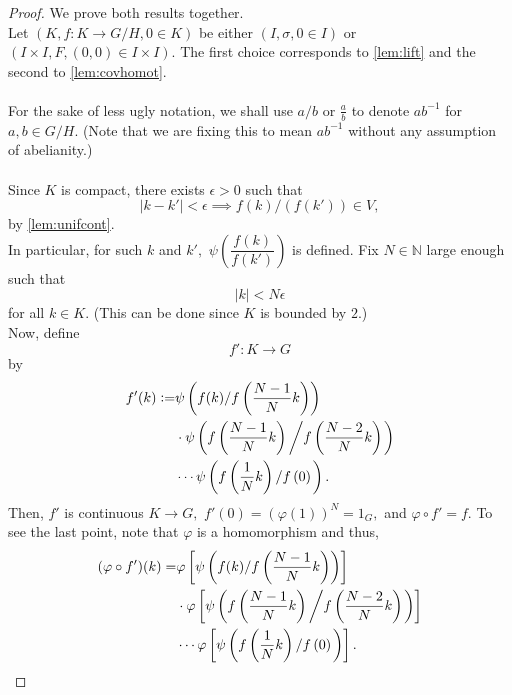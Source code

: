 \documentclass[12pt]{article}
\theoremstyle{definition}
\numberwithin{thm}{section}
\begin{document}
\begin{proof} 
 	We prove both results together.\\
 	Let $(K, f:K\to G/H, 0 \in K)$ be either $(I, \sigma, 0 \in I)$ or $(I \times I, F, (0, 0) \in I \times I).$ The first choice corresponds to \cref{lem:lift} and the second to \cref{lem:covhomot}. \\~\\
 	For the sake of less ugly notation, we shall use $a/b$ or $\frac{a}{b}$ to denote $ab^{-1}$ for $a, b \in G/H.$ (Note that we are fixing this to mean $ab^{-1}$ without any assumption of abelianity.)\\~\\
 	Since $K$ is compact, there exists $\epsilon > 0$ such that 
 	\begin{equation*} 
 		|k - k'| < \epsilon \implies f(k)/(f(k')) \in V,
 	\end{equation*} by \cref{lem:unifcont}.\\
 	In particular, for such $k$ and $k',$ $\psi\left(\dfrac{f(k)}{f(k')}\right)$ is defined. Fix $N \in \mathbb{N}$ large enough such that
 	\begin{equation*} 
 		|k| < N\epsilon
 	\end{equation*}
 	for all $k \in K.$ (This can be done since $K$ is bounded by $2$.)\\
 	Now, define
 	\begin{equation*} 
 		f':K \to G
 	\end{equation*}
 	by
 	\begin{align*} 
 		f'(k) \vcentcolon= &\psi\left(f(k)/f\left(\dfrac{N-1}{N}k\right)\right)\\
 		& \cdot \psi\left(f\left(\dfrac{N-1}{N}k\right)\left/f\left(\dfrac{N-2}{N}k\right)\right.\right)\\
 		& \cdots \psi\left(f\left(\dfrac{1}{N}k\right)\left/f\left(0\right)\right.\right).
 	\end{align*}
 	Then, $f'$ is continuous $K \to G,$ $f'(0) = (\varphi(1))^N = 1_G,$ and $\varphi\circ f' = f.$ To see the last point, note that $\varphi$ is a homomorphism and thus,
 	\begin{align*} 
 		(\varphi\circ f')(k) = &\varphi\left[\psi\left(f(k)/f\left(\dfrac{N-1}{N}k\right)\right)\right]\\
 		& \cdot \varphi\left[\psi\left(f\left(\dfrac{N-1}{N}k\right)\left/f\left(\dfrac{N-2}{N}k\right)\right.\right)\right]\\
 		& \cdots \varphi\left[\psi\left(f\left(\dfrac{1}{N}k\right)\left/f\left(0\right)\right.\right)\right].

\end{align*}
\end{proof}
\end{document}
